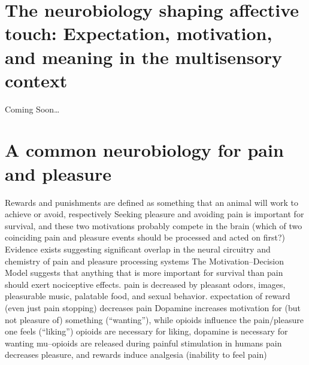 \documentclass[11pt, a4paper, oneside]{article}   	%
\begin{document}
\section{The neurobiology shaping affective touch: Expectation, motivation, and meaning in the multisensory context \cite{Ellingsen2016}}

Coming Soon\ldots

\section{A common neurobiology for pain and pleasure \cite{Leknes2008}}

\begin{outline}
    \point Rewards and punishments are defined as something that an animal will work to achieve or avoid, respectively
        \subpoint Seeking pleasure and avoiding pain is important for survival, and these two motivations probably compete in the brain (which of two coinciding pain and pleasure events should be processed and acted on first?)
        \subpoint Evidence exists suggesting significant overlap in the neural circuitry and chemistry of pain and pleasure processing systems
    \point The Motivation--Decision Model suggests that anything that is more important for survival than pain should exert nociceptive effects.
    \point pain is decreased by pleasant odors, images, pleasurable music, palatable food, and sexual behavior.
    \point expectation of reward (even just pain stopping) decreases pain
    \point Dopamine increases motivation for (but not pleasure of) something (``wanting''), while opioids influence the pain/pleasure one feels (``liking'')
        \subpoint opioids are necessary for liking, dopamine is necessary for wanting
    \point mu--opioids are released during painful stimulation in humans
    \point pain decreases pleasure, and rewards induce analgesia (inability to feel pain)
    
\end{outline}





\end{document}

